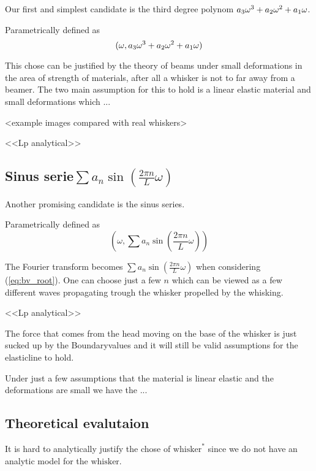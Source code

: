     Our first and simplest candidate is the third degree polynom $a_3\omega^3+a_2\omega^2+a_1\omega$.

    Parametrically defined as
    \begin{equation}
        (\omega,a_3\omega^3+a_2\omega^2+a_1\omega)
    \end{equation}

    This chose can be justified by the theory of beams under small deformations 
    in the area of strength of materials, after all a whisker is not to far 
    away from a beamer\cite{Hallfasthet}. The two main assumption
    for this to hold is a linear elastic material and small deformations which
    ...

    <example images compared with real whiskers>

    <<Lp analytical>>

\subsection{Sinus serie$\sum{a_n\sin (\frac{2\pi n}{L}\omega)}$}
    Another promising candidate is the sinus series.
    
    Parametrically defined as
    \begin{equation}
        (\omega,\sum{a_n\sin (\frac{2\pi n}{L}\omega)})
    \end{equation}

    
    The Fourier transform becomes $\sum{a_n\sin (\frac{2\pi n}{L}\omega)}$ when
    considering (\ref{eq:bv_root}). One can choose just a few $n$ which can be
    viewed as a few different waves propagating trough the whisker propelled by
    the whisking. 

    <<Lp analytical>>


The force that comes from the head moving on the base of the whisker is just 
sucked up by the Boundaryvalues and it will still be valid assumptions for the
elasticline to hold.

Under just a few assumptions that the material is linear elastic and the
deformations are small we have the ...

\subsection{Theoretical evalutaion}
    It is hard to analytically justify the chose of $\text{whisker}^*$ since we do not
    have an analytic model for the $\text{whisker}$.



